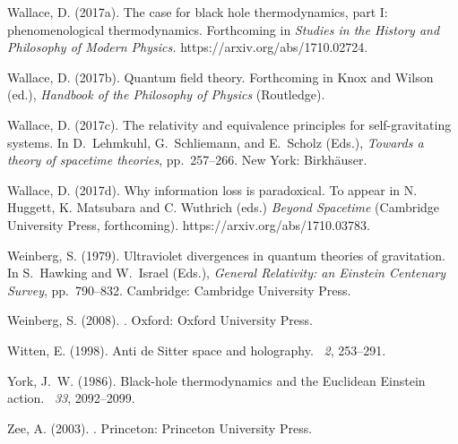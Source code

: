 \documentclass{article}
\begin{document}
\begin{thebibliography}{}
Wallace, D. (2017a).
\newblock The case for black hole thermodynamics, part {I}: phenomenological
  thermodynamics.
\newblock Forthcoming in \emph{Studies in the History and Philosophy of Modern
  Physics.} https://arxiv.org/abs/1710.02724.

Wallace, D. (2017b).
\newblock Quantum field theory.
\newblock Forthcoming in Knox and Wilson (ed.), \emph{Handbook of the
  Philosophy of Physics} (Routledge).

Wallace, D. (2017c).
\newblock The relativity and equivalence principles for self-gravitating
  systems.
\newblock In D.~Lehmkuhl, G.~Schliemann, and E.~Scholz (Eds.), {\em Towards a
  theory of spacetime theories}, pp.\  257--266. New York: Birkh{\"a}user.

Wallace, D. (2017d).
\newblock Why information loss is paradoxical.
\newblock To appear in N. Huggett, K. Matsubara and C. Wuthrich (eds.)
  \emph{Beyond Spacetime} (Cambridge University Press, forthcoming).
  https://arxiv.org/abs/1710.03783.

Weinberg, S. (1979).
\newblock Ultraviolet divergences in quantum theories of gravitation.
\newblock In S.~Hawking and W.~Israel (Eds.), {\em General Relativity: an
  {E}instein Centenary Survey}, pp.\  790--832. Cambridge: Cambridge University
  Press.

Weinberg, S. (2008).
.
\newblock Oxford: Oxford University Press.

Witten, E. (1998).
\newblock Anti de {S}itter space and holography.
~{\em 2},
  253--291.

York, J.~W. (1986).
\newblock Black-hole thermodynamics and the {E}uclidean {E}instein action.
~{\em 33}, 2092--2099.

Zee, A. (2003).
.
\newblock Princeton: Princeton University Press.

\end{thebibliography}
\end{document}
